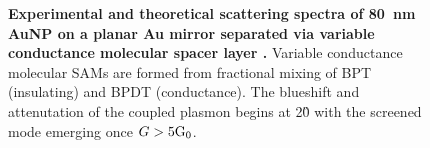 \documentclass{article}
\begin{document}
\begin{figure}[bt]
\centering
\vspace{-10pt}
\caption[Experimental and theoretical scattering spectra of \SI{80}{nm} AuNP dimers connected via variable conductance molecular linkers \cite{benz2014}]{\textbf{Experimental and theoretical scattering spectra of \SI{80}{nm} AuNP on a planar Au mirror separated via variable conductance molecular spacer layer \cite{benz2014}.} Variable conductance molecular SAMs are formed from fractional mixing of BPT (insulating) and BPDT (conductance). The blueshift and attenutation of the coupled plasmon begins at 2\G0 with the screened mode emerging once $G>5\mathrm{G_{0}}$.}
\label{fig:benz_molecular_npom}
\vspace{-5pt}
\end{figure}
\end{document}
